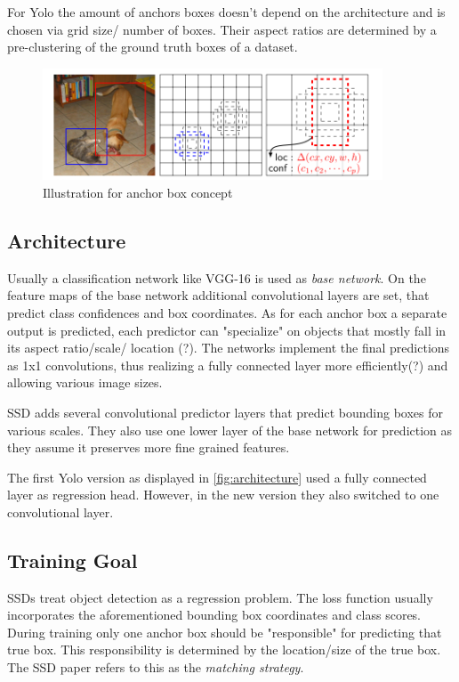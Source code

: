 	For Yolo the amount of anchors boxes doesn't depend on the architecture and is chosen via grid size/ number of boxes. Their aspect ratios are determined by a pre-clustering of the ground truth boxes of a dataset.
	\begin{figure}[h]
		\centering
		\includegraphics[width=0.9\textwidth]{fig/anchors}
		\caption{Illustration for anchor box concept \cite{Liu}}
		\label{fig:anchors}
	\end{figure}
	\subsection{Architecture}
	
	Usually a classification network like VGG-16 is used as \textit{base network}. On the feature maps of the base network additional convolutional layers are set, that predict class confidences and box coordinates. As for each anchor box a separate output is predicted, each predictor can "specialize" on objects that mostly fall in its aspect ratio/scale/ location (?). The networks implement the final predictions as 1x1 convolutions, thus realizing a fully connected layer more efficiently(?) and allowing various image sizes.
	
	SSD adds several convolutional predictor layers that predict bounding boxes for various scales. They also use one lower layer of the base network for prediction as they assume it preserves more fine grained features.
	
	The first Yolo version as displayed in \autoref{fig:architecture} used a fully connected layer as regression head. However, in the new version they also switched to one convolutional layer.
	
	\subsection{Training Goal}
	SSDs treat object detection as a regression problem. The loss function usually incorporates the aforementioned bounding box coordinates and class scores. During training only one anchor box should be "responsible" for predicting that true box. This responsibility is determined by the location/size of the true box. The SSD paper refers to this as the \textit{matching strategy}.
	
